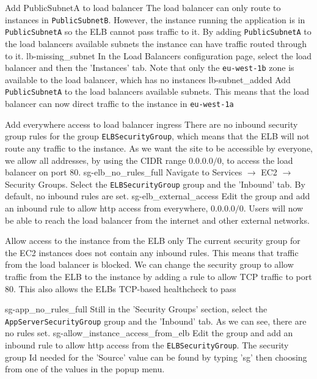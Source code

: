 {Add PublicSubnetA to load balancer}
{
	The load balancer can only route to instances in \texttt{PublicSubnetB}. However, the instance running the application is in \texttt{PublicSubnetA} so the ELB cannot pass traffic to it. By adding \texttt{PublicSubnetA} to the load balancers available subnets the instance can have traffic routed through to it.
}
{
	\imagefigsinglebox
	{lb-missing_subnet}
	{In the Load Balancers configuration page, select the load balancer and then the 'Instances' tab. Note that only the \texttt{eu-west-1b} zone is available to the load balancer, which has no instances}
	\imagefigsinglebox
		{lb-subnet_added}
	{Add \texttt{PublicSubnetA} to the load balancers available subnets. This means that the load balancer can now direct traffic to the instance in \texttt{eu-west-1a}}
}

\FloatBarrier

{Add everywhere access to load balancer ingress}
{
There are no inbound security group rules for the group \texttt{ELBSecurityGroup}, which means that the ELB will not route any traffic to the instance. As we want the site to be accessible by everyone, we allow all addresses, by using the CIDR range $0.0.0.0/0$, to access the load balancer on port $80$.
}
{
	\imagefigsinglebox
	{sg-elb_no_rules_full}
 	{ Navigate to Services  $\rightarrow$ EC2  $\rightarrow$ Security Groups. Select the \texttt{ELBSecurityGroup} group and the 'Inbound' tab. By default, no inbound rules are set.}
	\imagefigsinglebox
	{sg-elb_external_access}
	{Edit the group and add an inbound rule to allow http access from everywhere, $0.0.0.0/0$. Users will now be able to reach the load balancer from the internet and other external networks.}
}


\FloatBarrier


{Allow access to the instance from the ELB only}
{The current security group for the EC2 instances does not contain any inbound rules. This means that traffic from the load balancer is blocked. We can change the security group to allow traffic from the ELB to the instance by adding a rule to allow TCP traffic to port 80. This also allows the ELBs TCP-based healthcheck to pass
}
{
	
	\imagefigsinglebox
	{sg-app_no_rules_full}
	{Still in the 'Security Groups' section, select the \texttt{AppServerSecurityGroup} group and the 'Inbound' tab. As we can see, there are no rules set.}
	\imagefigsinglebox
	{sg-allow_instance_access_from_elb}
	{Edit the group and add an inbound rule to allow http access from the \texttt{ELBSecurityGroup}. The security group Id needed for the 'Source' value can be found by typing 'sg' then choosing from one of the values in the popup menu.}
}

